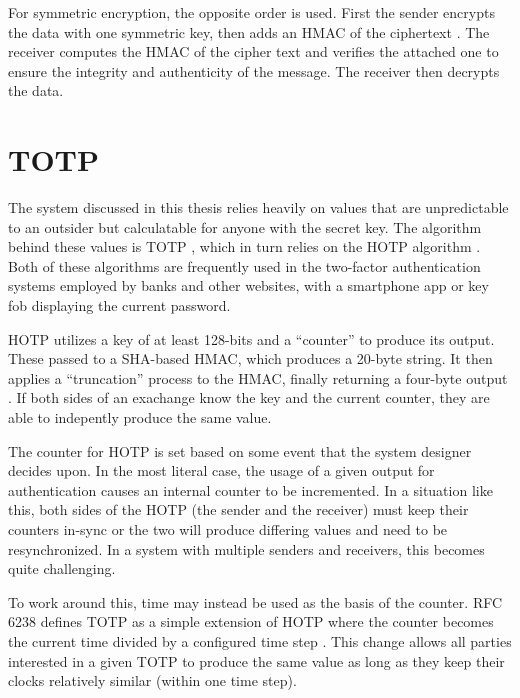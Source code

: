 \par For symmetric encryption, the opposite order is used. First the sender encrypts the data with one symmetric key, then adds an \ac{HMAC} of the ciphertext \cite{AuthEncrypt}. The receiver computes the \ac{HMAC} of the cipher text and verifies the attached one to ensure the integrity and authenticity of the message. The receiver then decrypts the data.

\section{\acf{TOTP}}
\label{sec:totp}
\par The system discussed in this thesis relies heavily on values that are unpredictable to an outsider but calculatable for anyone with the secret key. The algorithm behind these values is \ac{TOTP} \cite{rfc6238}, which in turn relies on the \ac{HOTP} algorithm \cite{rfc4226}. Both of these algorithms are frequently used in the two-factor authentication systems employed by banks and other websites, with a smartphone app or key fob displaying the current password.

\par \ac{HOTP} utilizes a key of at least 128-bits and a ``counter'' to produce its output. These passed to a \ac{SHA}-based \ac{HMAC}, which produces a 20-byte string. It then applies a ``truncation'' process to the \ac{HMAC}, finally returning a four-byte output \cite{rfc4226}. If both sides of an exachange know the key and the current counter, they are able to indepently produce the same value.

\par The counter for \ac{HOTP} is set based on some event that the system designer decides upon. In the most literal case, the usage of a given output for authentication causes an internal counter to be incremented. In a situation like this, both sides of the HOTP (the sender and the receiver) must keep their counters in-sync or the two will produce differing values and need to be resynchronized. In a system with multiple senders and receivers, this becomes quite challenging.

\par To work around this, time may instead be used as the basis of the counter. RFC 6238 defines \ac{TOTP} as a simple extension of \ac{HOTP} where the counter becomes the current time divided by a configured time step \cite{rfc6238}. This change allows all parties interested in a given \ac{TOTP} to produce the same value as long as they keep their clocks relatively similar (within one time step). 

